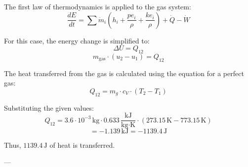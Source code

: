 The first law of thermodynamics is applied to the gas system:  
\[
\frac{dE}{dt} = \sum \dot{m}_i \left( h_i + \frac{pe_i}{\rho} + \frac{ke_i}{\rho} \right) + \dot{Q} - \dot{W}
\]  

For this case, the energy change is simplified to:  
\[
\Delta U = Q_{12}
\]  
\[
m_{\text{gas}} \cdot (u_2 - u_1) = Q_{12}
\]  

The heat transferred from the gas is calculated using the equation for a perfect gas:  
\[
Q_{12} = m_g \cdot c_V \cdot (T_2 - T_1)
\]  

Substituting the given values:  
\[
Q_{12} = 3.6 \cdot 10^{-3} \, \text{kg} \cdot 0.633 \, \frac{\text{kJ}}{\text{kg·K}} \cdot (273.15 \, \text{K} - 773.15 \, \text{K})
\]  
\[
= -1.139 \, \text{kJ} = -1139.4 \, \text{J}
\]  

Thus, \( 1139.4 \, \text{J} \) of heat is transferred.  

---